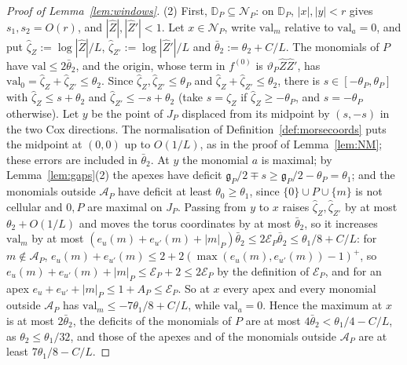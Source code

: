 \begin{proof}[Proof of Lemma~\ref{lem:windows}]
(2) First, $\mathbb D_P\subseteq\mathcal N_P$: on $\mathbb D_P$, $|x|,|y|<r$ gives $s_1,s_2=O(r)$, and $|\hat Z|,|\hat Z'|<1$.
Let $x\in\mathcal N_P$, write $\mathrm{val}_m$ relative to $\mathrm{val}_a=0$, and put $\hat\zeta_Z:=\log|\hat Z|/L$,
$\hat\zeta_{Z'}:=\log|\hat Z'|/L$ and $\bar\theta_2:=\theta_2+C/L$. The monomials of $P$ have $\mathrm{val}\le2\bar\theta_2$, and
the origin, whose term in $f^{(0)}$ is $\vartheta_P\hat Z\hat Z'$, has $\mathrm{val}_0=\hat\zeta_Z+\hat\zeta_{Z'}\le\theta_2$.
Since $\hat\zeta_Z,\hat\zeta_{Z'}\le\theta_P$ and $\hat\zeta_Z+\hat\zeta_{Z'}\le\theta_2$, there is $s\in[-\theta_P,\theta_P]$ with
$\hat\zeta_Z\le s+\theta_2$ and $\hat\zeta_{Z'}\le-s+\theta_2$ (take $s=\hat\zeta_Z$ if $\hat\zeta_Z\ge-\theta_P$, and
$s=-\theta_P$ otherwise). Let $y$ be the point of $J_P$ displaced from its midpoint by $(s,-s)$ in the two Cox
directions. The normalisation of Definition~\ref{def:morsecoords} puts the midpoint at $(0,0)$ up to $O(1/L)$, as in
the proof of Lemma~\ref{lem:NM}; these errors are included in $\bar\theta_2$. At $y$ the monomial $a$ is
maximal; by Lemma~\ref{lem:gaps}(2) the apexes have deficit $\mathfrak g_P/2\mp s\ge\mathfrak g_P/2-\theta_P=\theta_1$; and the
monomials outside $\mathcal A_P$ have deficit at least $\theta_0\ge\theta_1$, since $\{0\}\cup P\cup\{m\}$ is not cellular and
$0,P$ are maximal on $J_P$. Passing from $y$ to $x$ raises $\hat\zeta_Z,\hat\zeta_{Z'}$ by at most $\theta_2+O(1/L)$ and moves the
torus coordinates by at most $\bar\theta_2$, so it increases $\mathrm{val}_m$ by at most
$(e_u(m)+e_{u'}(m)+|m|_P)\bar\theta_2\le2\mathcal E_P\bar\theta_2\le\theta_1/8+C/L$: for $m\notin\mathcal A_P$,
$e_u(m)+e_{u'}(m)\le2+2(\max(e_u(m),e_{u'}(m))-1)^+$, so $e_u(m)+e_{u'}(m)+|m|_P\le\mathcal E_P+2\le2\mathcal E_P$ by the
definition of $\mathcal E_P$, and for an apex $e_u+e_{u'}+|m|_P\le1+A_P\le\mathcal E_P$. So at $x$ every apex and every
monomial outside $\mathcal A_P$ has $\mathrm{val}_m\le-7\theta_1/8+C/L$, while $\mathrm{val}_a=0$. Hence the maximum at $x$ is at
most $2\bar\theta_2$, the deficits of the monomials of $P$ are at most $4\bar\theta_2<\theta_1/4-C/L$, as
$\theta_2\le\theta_1/32$, and those of the apexes and of the monomials outside $\mathcal A_P$ are at least
$7\theta_1/8-C/L$.


\end{proof}
